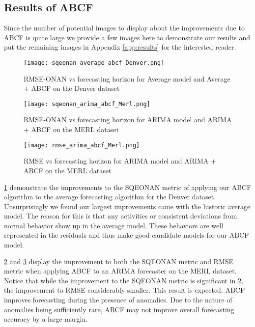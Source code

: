 \subsection{Results of ABCF}
Since the number of potential images to display about the improvements due to ABCF is quite large  we provide a few images here to demonstrate our results and put the remaining images in Appendix \ref{app:results} for the interested reader.

\begin{figure}[!b]
	\begin{center}
		\texttt{[image: sqeonan\_average\_abcf\_Denver.png]}
	\end{center}
	\caption{RMSE-ONAN vs forecasting horizon for Average model and Average + ABCF on the Denver dataset}
	\label{fig:average_abcf_denver}
\end{figure}


\begin{figure}[!b]
	\begin{center}
		\texttt{[image: sqeonan\_arima\_abcf\_Merl.png]}
	\end{center}
	\caption{RMSE-ONAN vs forecasting horizon for ARIMA model and ARIMA + ABCF on the MERL dataset}
	\label{fig:arima_merl_sqe}
\end{figure}


\begin{figure}[!h]
	\begin{center}
		\texttt{[image: rmse\_arima\_abcf\_Merl.png]}
	\end{center}
	\caption{RMSE vs forecasting horizon for ARIMA model and ARIMA + ABCF on the MERL dataset}
	\label{fig:arima_merl_rmse}
\end{figure}

\ref{fig:average_abcf_denver} demonstrate the improvements to the SQEONAN metric of applying our ABCF algorithm to the average forecasting algorithm for the Denver dataset.  Unsurprisingly we found our largest improvements came with the historic average model.  The reason for this is that any activities or consistent deviations from normal behavior show up in the average model.  These behaviors are well represented in the residuals and thus make good candidate models for our ABCF model.

\ref{fig:arima_merl_sqe} and \ref{fig:arima_merl_rmse} display the improvement to both the SQEONAN metric and RMSE metric when applying ABCF to an ARIMA forecaster on the MERL dataset.  Notice that while the improvement to the SQEONAN metric is significant in \ref{fig:arima_merl_sqe}, the improvement to RMSE considerably smaller.  This result is expected.  ABCF improves forecasting during the presence of anomalies.  Due to the nature of anomalies being sufficiently rare, ABCF may not improve overall forecasting accuracy by a large margin.

